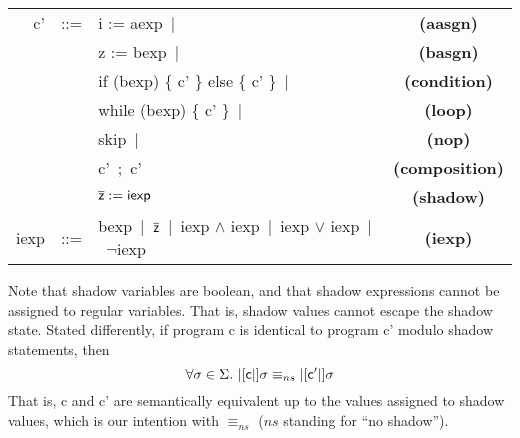\documentclass[]{article}
\newcommand{\lsyn}{|[}
\newcommand{\rsyn}{|]}
\begin{document}
\begin{tabular}{rclc}
	{\sf c'} & ::= & {\sf i := aexp}\ $|$ & {\bf (aasgn)}\\
	& 		  & {\sf z := bexp}\ $|$ & {\bf (basgn)} \\
	& 	 & {\sf if (bexp) \{ c' \} else \{ c' \}}\ $|$ & {\bf (condition)}\\
	& 	 & {\sf while (bexp) \{ c' \}}\ $|$ & {\bf (loop)}\\
			 		 & 	 & {\sf skip}\ $|$ & {\bf (nop)}\\
	& 	 & {\sf c'\ ;\ c'} & {\bf (composition)}\\
			 		  &  	  & ${\sf \overline{z} := iexp}$ & {\bf (shadow)} \\
   {\sf iexp}  & ::=  & {\sf bexp}\ $|$\ ${\sf \overline{z}}$\ $|$\
								{\sf iexp} $\wedge$ {\sf iexp}\ $|$\ {\sf iexp} $\vee$ {\sf iexp}\ $|$\ $\neg${\sf iexp} & {\bf (iexp)} \\			 		  
\end{tabular}

Note that shadow variables are boolean, and that shadow expressions cannot be assigned to regular variables. That is, shadow values cannot escape the shadow state. Stated differently, if program {\sf c} is identical to program {\sf c'} modulo shadow statements, then
$$
	\forall \sigma \in \Sigma.\ \lsyn {\sf c} \rsyn \sigma \equiv_{ns} \lsyn {\sf c'} \rsyn \sigma
$$
That is, {\sf c} and {\sf c'} are semantically equivalent up to the values assigned to shadow values, which is our intention with $\equiv_{ns}$ ($ns$ standing for ``no shadow'').

%
%
\end{document}
